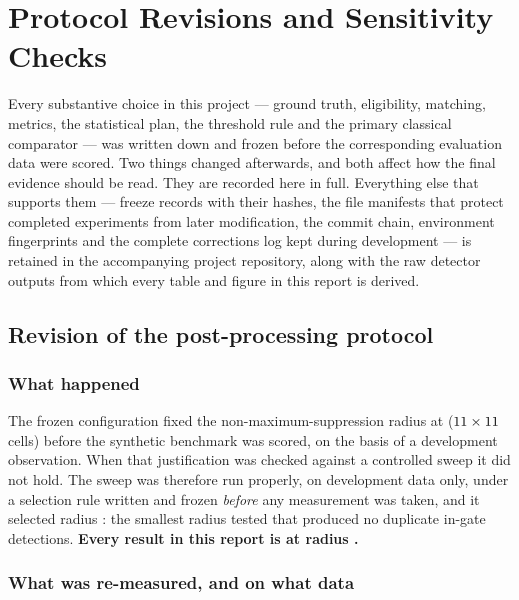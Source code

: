 \chapter{Protocol Revisions and Sensitivity Checks}
\label{app:prereg}

Every substantive choice in this project --- ground truth, eligibility, matching, metrics, the
statistical plan, the threshold rule and the primary classical comparator --- was written down and
frozen before the corresponding evaluation data were scored. Two things changed afterwards, and both
affect how the final evidence should be read. They are recorded here in full. Everything else that
supports them --- freeze records with their hashes, the file manifests that protect completed
experiments from later modification, the commit chain, environment fingerprints and the complete
corrections log kept during development --- is retained in the accompanying project repository, along
with the raw detector outputs from which every table and figure in this report is derived.

\section{Revision of the post-processing protocol}
\label{app:nmsrevision}

\subsection*{What happened}

The frozen configuration fixed the non-maximum-suppression radius at \ProtocolNmsOriginal{}
($11 \times 11$ cells) before the synthetic benchmark was
scored, on the basis of a development observation. When that justification was checked against a
controlled sweep it did not hold. The sweep was therefore run properly, on development data only,
under a selection rule written and frozen \emph{before} any measurement was taken, and it selected
radius \ProtocolNms{}: the smallest radius tested that produced no duplicate in-gate detections.
\textbf{Every result in this report is at radius \ProtocolNms{}.}

\subsection*{What was re-measured, and on what data}

